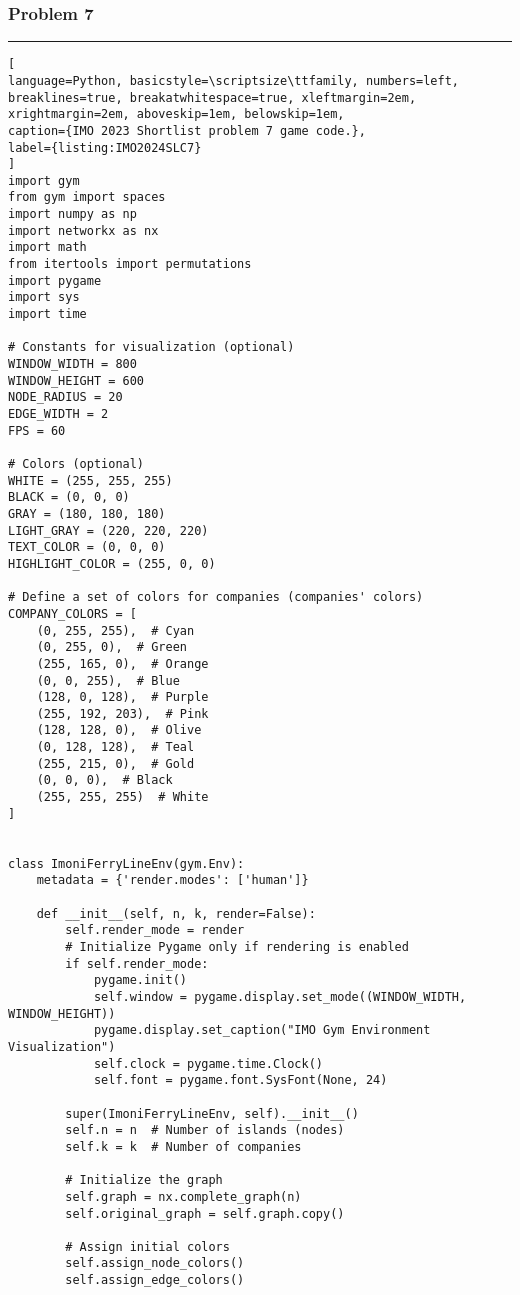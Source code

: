 \subsubsection*{Problem 7}
\label{appendix:G_2023_IMO_Shortlist_C7}


\hrule
\begin{lstlisting}[
language=Python, basicstyle=\scriptsize\ttfamily, numbers=left, breaklines=true, breakatwhitespace=true, xleftmargin=2em, xrightmargin=2em, aboveskip=1em, belowskip=1em,
caption={IMO 2023 Shortlist problem 7 game code.},
label={listing:IMO2024SLC7}
]
import gym
from gym import spaces
import numpy as np
import networkx as nx
import math
from itertools import permutations
import pygame
import sys
import time

# Constants for visualization (optional)
WINDOW_WIDTH = 800
WINDOW_HEIGHT = 600
NODE_RADIUS = 20
EDGE_WIDTH = 2
FPS = 60

# Colors (optional)
WHITE = (255, 255, 255)
BLACK = (0, 0, 0)
GRAY = (180, 180, 180)
LIGHT_GRAY = (220, 220, 220)
TEXT_COLOR = (0, 0, 0)
HIGHLIGHT_COLOR = (255, 0, 0)

# Define a set of colors for companies (companies' colors)
COMPANY_COLORS = [
    (0, 255, 255),  # Cyan
    (0, 255, 0),  # Green
    (255, 165, 0),  # Orange
    (0, 0, 255),  # Blue
    (128, 0, 128),  # Purple
    (255, 192, 203),  # Pink
    (128, 128, 0),  # Olive
    (0, 128, 128),  # Teal
    (255, 215, 0),  # Gold
    (0, 0, 0),  # Black
    (255, 255, 255)  # White
]


class ImoniFerryLineEnv(gym.Env):
    metadata = {'render.modes': ['human']}

    def __init__(self, n, k, render=False):
        self.render_mode = render
        # Initialize Pygame only if rendering is enabled
        if self.render_mode:
            pygame.init()
            self.window = pygame.display.set_mode((WINDOW_WIDTH, WINDOW_HEIGHT))
            pygame.display.set_caption("IMO Gym Environment Visualization")
            self.clock = pygame.time.Clock()
            self.font = pygame.font.SysFont(None, 24)

        super(ImoniFerryLineEnv, self).__init__()
        self.n = n  # Number of islands (nodes)
        self.k = k  # Number of companies

        # Initialize the graph
        self.graph = nx.complete_graph(n)
        self.original_graph = self.graph.copy()

        # Assign initial colors
        self.assign_node_colors()
        self.assign_edge_colors()


\end{lstlisting}
